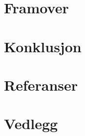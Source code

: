 \documentclass[aspectratio=169,11pt]{beamer}
\begin{document}
\section{Framover}


\section{Konklusjon}


\section*{Referanser}


\section*{Vedlegg}


\end{document}

